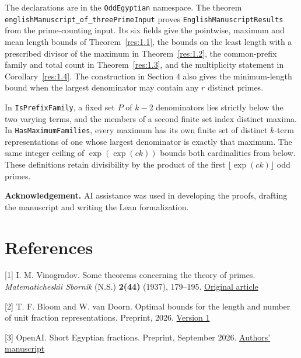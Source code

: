 \documentclass[11pt,a4paper]{article}
\newcommand{\decl}[1]{\texttt{\small #1}}
\begin{document}
The declarations are in the \decl{OddEgyptian} namespace. The theorem \decl{englishManuscript\_\allowbreak{}of\_\allowbreak{}threePrimeInput} proves \decl{EnglishManuscriptResults} from the prime-counting input. Its six fields give the pointwise, maximum and mean length bounds of Theorem~\ref{res:1.1}, the bounds on the least length with a prescribed divisor of the maximum in Theorem~\ref{res:1.2}, the common-prefix family and total count in Theorem~\ref{res:1.3}, and the multiplicity statement in Corollary~\ref{res:1.4}. The construction in Section 4 also gives the minimum-length bound when the largest denominator may contain any $r$ distinct primes.

In \decl{IsPrefixFamily}, a fixed set $P$ of $k-2$ denominators lies strictly below the two varying terms, and the members of a second finite set index distinct maxima. In \decl{HasMaximumFamilies}, every maximum has its own finite set of distinct $k$-term representations of one whose largest denominator is exactly that maximum. The same integer ceiling of $\exp(\exp(ck))$ bounds both cardinalities from below. These definitions retain divisibility by the product of the first $\lfloor\exp(ck)\rfloor$ odd primes.

\textbf{Acknowledgement.} AI assistance was used in developing the proofs, drafting the manuscript and writing the Lean formalization.

\section*{References}

\noindent\hypertarget{ref-1}{[1]} I. M. Vinogradov. Some theorems concerning the theory of primes. \emph{Matematicheskii Sbornik} (N.S.) \textbf{2(44)} (1937), 179–195. \href{https://www.mathnet.ru/eng/sm5565}{Original article}\par\smallskip

\noindent\hypertarget{ref-2}{[2]} T. F. Bloom and W. van Doorn. Optimal bounds for the length and number of unit fraction representations. Preprint, 2026. \href{https://hexagonmath.org/2610.00407v1}{Version 1}\par\smallskip

\noindent\hypertarget{ref-3}{[3]} OpenAI. Short Egyptian fractions. Preprint, September 2026. \href{https://github.com/openai/math/blob/main/preprints/Short-Egyptian-fractions-September-25-2026/Short-Egyptian-fractions-September-25-2026.pdf}{Authors' manuscript}\par\smallskip
\end{document}
